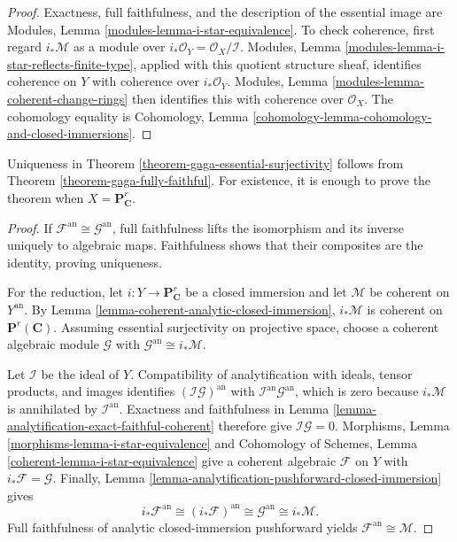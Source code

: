\begin{proof}
Exactness, full faithfulness, and the description of the essential image are
Modules, Lemma \ref{modules-lemma-i-star-equivalence}. To check coherence,
first regard $i_*\mathcal M$ as a module over
$i_*\mathcal O_Y=\mathcal O_X/\mathcal I$. Modules, Lemma
\ref{modules-lemma-i-star-reflects-finite-type}, applied with this quotient
structure sheaf, identifies coherence on $Y$ with coherence over
$i_*\mathcal O_Y$. Modules, Lemma
\ref{modules-lemma-coherent-change-rings} then identifies this with
coherence over $\mathcal O_X$. The cohomology equality is Cohomology, Lemma
\ref{cohomology-lemma-cohomology-and-closed-immersions}.
\end{proof}

\begin{lemma}
\label{lemma-gaga-essential-surjectivity-projective-reduction}
Uniqueness in Theorem \ref{theorem-gaga-essential-surjectivity} follows from
Theorem \ref{theorem-gaga-fully-faithful}. For existence, it is enough to
prove the theorem when $X=\mathbf P^r_{\mathbf C}$.
\end{lemma}

\begin{proof}
If $\mathcal F^{\mathrm{an}}\cong\mathcal G^{\mathrm{an}}$, full faithfulness
lifts the isomorphism and its inverse uniquely to algebraic maps. Faithfulness
shows that their composites are the identity, proving uniqueness.

For the reduction, let $i:Y\to\mathbf P^r_{\mathbf C}$ be a closed immersion
and let $\mathcal M$ be coherent on $Y^{\mathrm{an}}$. By Lemma
\ref{lemma-coherent-analytic-closed-immersion}, $i_*\mathcal M$ is coherent
on $\mathbf P^r(\mathbf C)$. Assuming essential surjectivity on projective
space, choose a coherent algebraic module $\mathcal G$ with
$\mathcal G^{\mathrm{an}}\cong i_*\mathcal M$.

Let $\mathcal I$ be the ideal of $Y$. Compatibility of analytification with
ideals, tensor products, and images identifies
$(\mathcal I\mathcal G)^{\mathrm{an}}$ with
$\mathcal I^{\mathrm{an}}\mathcal G^{\mathrm{an}}$, which is zero because
$i_*\mathcal M$ is annihilated by $\mathcal I^{\mathrm{an}}$. Exactness and
faithfulness in Lemma
\ref{lemma-analytification-exact-faithful-coherent} therefore give
$\mathcal I\mathcal G=0$. Morphisms, Lemma
\ref{morphisms-lemma-i-star-equivalence} and Cohomology of Schemes, Lemma
\ref{coherent-lemma-i-star-equivalence} give a coherent algebraic
$\mathcal F$ on $Y$ with $i_*\mathcal F=\mathcal G$. Finally,
Lemma \ref{lemma-analytification-pushforward-closed-immersion} gives
$$
i_*\mathcal F^{\mathrm{an}}
\cong(i_*\mathcal F)^{\mathrm{an}}
\cong\mathcal G^{\mathrm{an}}
\cong i_*\mathcal M.
$$
Full faithfulness of analytic closed-immersion pushforward yields
$\mathcal F^{\mathrm{an}}\cong\mathcal M$.
\end{proof}

